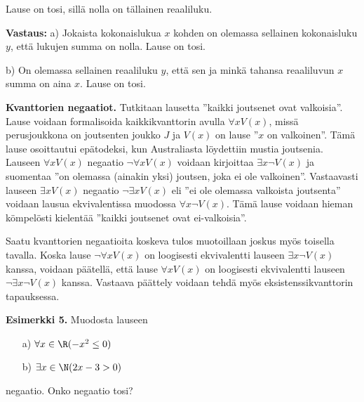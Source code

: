 Lause on tosi, sillä nolla on tällainen reaaliluku.

{\bf Vastaus:} a) Jokaista kokonaislukua $x$ kohden on olemassa
sellainen kokonaisluku $y$, että lukujen summa on nolla. Lause on
tosi.

b) On olemassa sellainen reaaliluku $y$, että sen ja minkä
tahansa reaaliluvun $x$ summa on aina $x$. Lause on tosi.


{\bf Kvanttorien negaatiot.} Tutkitaan lausetta ''kaikki joutsenet ovat valkoisia''. Lause voidaan formalisoida kaikkikvanttorin avulla $\forall x V(x)$, missä perusjoukkona on joutsenten joukko $J$ ja $V(x)$ on lause ''$x$ on valkoinen''. Tämä lause osoittautui epätodeksi, kun Australiasta löydettiin mustia joutsenia. Lauseen $\forall x V(x)$ negaatio $\lnot \forall x V(x)$ voidaan kirjoittaa $\exists x \lnot V(x)$ ja suomentaa ''on olemassa (ainakin yksi) joutsen, joka ei ole valkoinen''. Vastaavasti lauseen $\exists x V(x)$ negaatio $\lnot \exists x V(x)$ eli ''ei ole olemassa valkoista joutsenta'' voidaan lausua ekvivalentissa muodossa $\forall x \lnot V(x)$. Tämä lause voidaan hieman kömpelösti kielentää ''kaikki joutsenet ovat ei-valkoisia''.


Saatu kvanttorien negaatioita koskeva tulos muotoillaan joskus myös toisella tavalla. Koska lause $\lnot \forall x V(x)$ on loogisesti ekvivalentti lauseen $\exists x\lnot V(x)$ kanssa, voidaan päätellä, että lause $\forall x V(x)$ on loogisesti ekvivalentti lauseen $\lnot \exists x\lnot V(x)$ kanssa. Vastaava päättely voidaan tehdä myös eksistenssikvanttorin tapauksessa.



{\bf Esimerkki 5.}
Muodosta lauseen
\begin{itemize}
\item[a)] $\forall x \in \R(-x^2 \le 0)$
\item[b)] $\exists x\in \N(2x-3>0)$
\end{itemize}
negaatio. Onko negaatio tosi?

